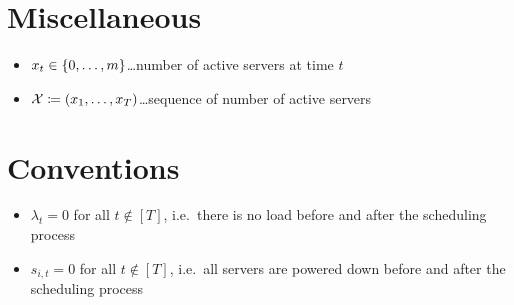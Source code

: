 \section*{Miscellaneous}
\begin{itemize}
	\item $x_t\in\{0,\dotsc,m\}$\ldots number of active servers at time $t$
	\item $\mathcal{X}\coloneqq(x_1,\ldots,x_T)$\ldots sequence of number of active servers
\end{itemize}

\section*{Conventions}
\begin{itemize}
	\item $\lambda_{t}=0$ for all $t\notin[T]$, i.e.\ there is no load before and after the scheduling process
	\item $s_{i,t}=0$ for all $t\notin[T]$, i.e.\ all servers are powered down before and after the scheduling process
\end{itemize}
